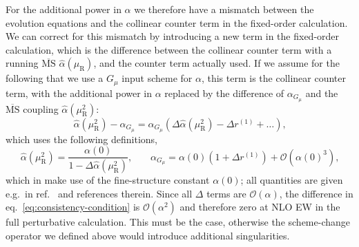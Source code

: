 For the additional power in $\alpha$ we therefore have a mismatch between the evolution equations and the collinear counter term in the fixed-order calculation.
We can correct for this mismatch by introducing a new term in the fixed-order calculation, which is the difference between the collinear counter term with a running $\overline{\mathrm{MS}}$ $\hat{\alpha} (\mu_\mathrm{R})$, and the counter term actually used.
If we assume for the following that we use a $G_\mu$ input scheme for $\alpha$, this term is the collinear counter term, with the additional power in $\alpha$ replaced by the difference of $\alpha_{G_\mu}$ and the $\overline{\text{MS}}$ coupling $\hat{\alpha} (\mu_\mathrm{R}^2)$:
\begin{equation}
\hat{\alpha} (\mu_\mathrm{R}^2) - \alpha_{G_\mu} = \alpha_{G_\mu} \left( \Delta \hat{\alpha} (\mu_\mathrm{R}^2) - \Delta r^{(1)} + \ldots \right) \text{,} \label{eq:consistency-condition}
\end{equation}
which uses the following definitions,
\begin{equation}
\hat{\alpha} (\mu_\mathrm{R}^2) = \frac{\alpha(0)}{1 - \Delta \hat{\alpha} (\mu_\mathrm{R}^2)} \text{,} \qquad \alpha_{G_\mu} = \alpha(0) \left( 1 + \Delta r^{(1)} \right) + \mathcal{O} (\alpha(0)^3) \text{,}
\end{equation}
which in make use of the fine-structure constant $\alpha(0)$; all quantities are given e.g.\ in ref.~\cite{Denner:2019vbn} and references therein.
Since all $\Delta$ terms are $\mathcal{O} (\alpha)$, the difference in eq.~\eqref{eq:consistency-condition} is $\mathcal{O} (\alpha^2)$ and therefore zero at NLO EW in the full perturbative calculation.
This must be the case, otherwise the scheme-change operator we defined above would introduce additional singularities.
